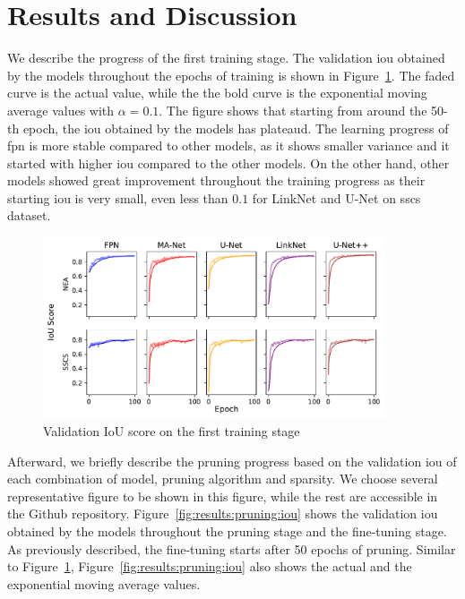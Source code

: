 \documentclass[mathematics,article,submit,pdftex,moreauthors]{Definitions/mdpi}
\begin{document}
\section {Results and Discussion}
We describe the progress of the first
training stage. The validation \ac{iou}
obtained by the models throughout the epochs
of training is shown in 
Figure~\ref{fig:results:training:iou}.
The faded curve is the actual value, while the 
the bold curve is the exponential moving average
values with $\alpha=0.1$. The figure shows that
starting from around the 50-th epoch, the \ac{iou}
obtained by the models has plateaud.
The learning progress of \ac{fpn} is more stable
compared to other models, as it shows smaller variance
and it started with higher \ac{iou} compared to the other models.
On the other hand, other models showed great improvement
throughout the training progress as their starting \ac{iou}
is very small, even less than $0.1$ for LinkNet and U-Net
on \ac{sscs} dataset.

\begin{figure}[htbp]
    \begin{center}
    \includegraphics[width=0.9\textwidth]{figures/iou_training_progress.pdf}
    \caption{Validation IoU score on the first training stage}
    \label{fig:results:training:iou}
    \end{center}
\end{figure}

Afterward, we briefly describe the pruning
progress based on the validation \ac{iou} of
each combination of model, pruning algorithm
and sparsity. We choose several representative
figure to be shown in this figure, while 
the rest are accessible in the Github repository.
Figure~\ref{fig:results:pruning:iou} shows the validation
\ac{iou} obtained by the models throughout the pruning
stage and the fine-tuning stage. As previously described,
the fine-tuning starts after 50 epochs of pruning. 
Similar to Figure~\ref{fig:results:training:iou},
Figure~\ref{fig:results:pruning:iou} also shows
the actual and the exponential moving average values.
\end{document}
